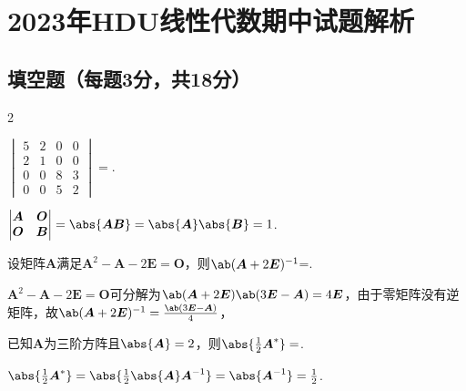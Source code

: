 \chapter{2023年HDU线性代数期中试题解析}
\section{填空题（每题3分，共18分）}
\vspace{-1em}
\begin{multicols}{2}
\begin{exercise}
    $
    \begin{vmatrix}
    5 & 2 & 0 & 0\\
    2 & 1 & 0 & 0\\
    0 & 0 & 8 & 3\\
    0 & 0 & 5 & 2
    \end{vmatrix}=
    $.
\end{exercise}
\begin{solution}
$\begin{vmatrix}
    \boldsymbol{A} & \boldsymbol{O}\\
    \boldsymbol{O} & \boldsymbol{B}
\end{vmatrix}=\abs{\boldsymbol{AB}}=\abs{\boldsymbol{A}}\abs{\boldsymbol{B}}=1$.
\end{solution}
\end{multicols}

\begin{exercise}
    设矩阵$\boldsymbol{A}$满足$\boldsymbol{A}^2-\boldsymbol{A}-2\boldsymbol{E}=\boldsymbol{O}$，则$\ab(\boldsymbol{A}+2\boldsymbol{E})^{-1}$=.
\end{exercise}
\begin{solution}
    $\boldsymbol{A}^2-\boldsymbol{A}-2\boldsymbol{E}=\boldsymbol{O}$可分解为$\ab(\boldsymbol{A}+2\boldsymbol{E})\ab(3\boldsymbol{E}-\boldsymbol{A})=4\boldsymbol{E}$，由于零矩阵没有逆矩阵，故$\ab(\boldsymbol{A}+2\boldsymbol{E})^{-1}=\frac{\ab(3\boldsymbol{E}-\boldsymbol{A})}{4}$，
\end{solution}

\begin{exercise}
    已知$\boldsymbol{A}$为三阶方阵且$\abs{\boldsymbol{A}}=2$，则$\abs{\frac{1}{2}\boldsymbol{A}^*}=$.
\end{exercise}
\begin{solution}
    $\abs{\frac{1}{2}\boldsymbol{A}^*}=\abs{\frac{1}{2}\abs{\boldsymbol{A}}\boldsymbol{A}^{-1}}=\abs{\boldsymbol{A}^{-1}}=\frac{1}{2}$.
\end{solution}


